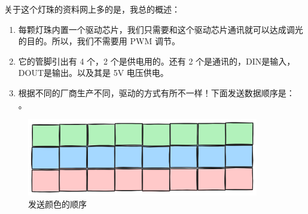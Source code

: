\documentclass[lang=cn,newtx,10pt,scheme=chinese]{elegantbook}
\begin{document}
关于这个灯珠的资料网上多的是，我总的概述：

\begin{enumerate}
\item 每颗灯珠内置一个驱动芯片，我们只需要和这个驱动芯片通讯就可以达成调光的目的。所以，我们不需要用 PWM 调节。
\item 它的管脚引出有 4 个，2 个是供电用的。还有 2 个是通讯的，DIN是输入，DOUT是输出。以及其是 5V 电压供电。
\item 根据不同的厂商生产不同，驱动的方式有所不一样！下面发送数据顺序是： 。
\end{enumerate}

\begin{figure}[!htb]
\centering
\includegraphics[width=0.9\textwidth]{rmt-rgb.png}
\caption{发送颜色的顺序}
\end{figure}
\end{document}
